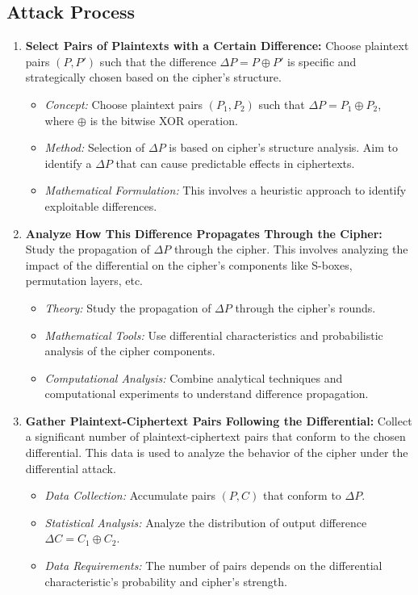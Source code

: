 \subsection{Attack Process}
\begin{enumerate}
	\item \textbf{Select Pairs of Plaintexts with a Certain Difference:}
	Choose plaintext pairs 
	$(P,P')$ such that the difference 
	$\Delta P=P\oplus P'$ is specific and strategically chosen based on the cipher's structure.
	\begin{itemize}
		\item \textit{Concept:} Choose plaintext pairs \((P_1, P_2)\) such that \(\Delta P = P_1 \oplus P_2\), where \(\oplus\) is the bitwise XOR operation.
		\item \textit{Method:} Selection of \(\Delta P\) is based on cipher's structure analysis. Aim to identify a \(\Delta P\) that can cause predictable effects in ciphertexts.
		\item \textit{Mathematical Formulation:} This involves a heuristic approach to identify exploitable differences.
	\end{itemize}
	
	\item \textbf{Analyze How This Difference Propagates Through the Cipher:} Study the propagation of \(\Delta P\) through the cipher. This involves analyzing the impact of the differential on the cipher's components like S-boxes, permutation layers, etc.
	\begin{itemize}
		\item \textit{Theory:} Study the propagation of \(\Delta P\) through the cipher's rounds.
		\item \textit{Mathematical Tools:} Use differential characteristics and probabilistic analysis of the cipher components.
		\item \textit{Computational Analysis:} Combine analytical techniques and computational experiments to understand difference propagation.
	\end{itemize}
	
	\item \textbf{Gather Plaintext-Ciphertext Pairs Following the Differential:} Collect a significant number of plaintext-ciphertext pairs that conform to the chosen differential. This data is used to analyze the behavior of the cipher under the differential attack.
	\begin{itemize}
		\item \textit{Data Collection:} Accumulate pairs \((P, C)\) that conform to \(\Delta P\).
		\item \textit{Statistical Analysis:} Analyze the distribution of output difference \(\Delta C = C_1 \oplus C_2\).
		\item \textit{Data Requirements:} The number of pairs depends on the differential characteristic's probability and cipher's strength.
	\end{itemize}
	

\end{enumerate}
